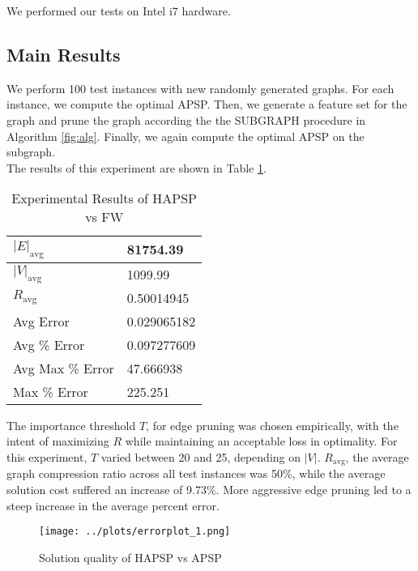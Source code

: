 \documentclass[10.5pt,journal]{IEEEtran}
\begin{document}
		We performed our tests on Intel i7 hardware. 
		
	\subsection{Main Results}
		We perform 100 test instances with new randomly generated graphs. For each instance, we
		compute the optimal APSP. Then, we generate a feature set for the graph and prune the graph
		according the the SUBGRAPH procedure in Algorithm \ref{fig:alg}. Finally, we again compute
		the optimal APSP on the subgraph. \\
		
		The results of this experiment are shown in Table \ref{fig:main_tbl}.
		
		\begin{table}[h!] \normalsize
		\centering
		\caption{Experimental Results of HAPSP vs FW}
		\label{my-label}
 		\begin{tabular}{|l|l|} 								\hline
		$|E|_{\mbox{avg}}$              & 81754.39			\\\hline
		$|V|_{\mbox{avg}}$              & 1099.99			\\\hline
		$R_{\mbox{avg}}$                & 0.50014945		\\\hline
		Avg Error         				& 0.029065182		\\\hline
		Avg \% Error 					& 0.097277609		\\\hline
		Avg Max \% Error      			& 47.666938			\\\hline
		Max \% Error			        & 225.251			\\\hline
		\end{tabular}
		\label{fig:main_tbl}
		\end{table}
	
		The importance threshold $T$, for edge pruning was chosen empirically, with the intent of
		maximizing $R$ while maintaining an acceptable loss in optimality. For this experiment,
		$T$ varied between 20 and 25, depending on $|V|$. 
		$R_{\mbox{avg}}$, the average graph compression ratio across all test instances was 50\%, while
		the average solution cost suffered an increase of 9.73\%. More aggressive edge pruning led to
		a steep increase in the average percent error. \\
				
		\begin{figure*}[] \centering
		\texttt{[image: ../plots/errorplot\_1.png]} 
		\caption{Solution quality of HAPSP vs APSP}
		\label{fig:error_plt}
		\end{figure*}
		
\end{document}
